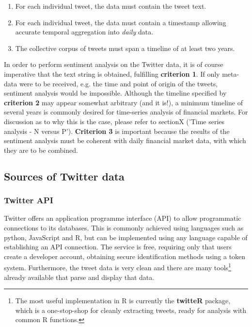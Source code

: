 \documentclass{article}
\begin{document}
\begin{enumerate}
\item For each individual tweet, the data must contain the tweet text.
\item For each individual tweet, the data must contain a timestamp allowing accurate temporal aggregation into \emph{daily} data.
\item The collective corpus of tweets must span a timeline of at least two years.
\end{enumerate}

In order to perform sentiment analysis on the Twitter data, it is of course imperative that the text string is obtained, fulfilling \textbf{criterion 1}. If only meta-data were to be received, e.g. the time and point of origin of the tweets, sentiment analysis would be impossible. Although the timeline specified by \textbf{criterion 2} may appear somewhat arbitrary (and it is!), a minimum timeline of several years is commonly desired for time-series analysis of financial markets. For discussion as to why this is the case, please refer to sectionX ('Time series analysis - N versus P'). \textbf{Criterion 3} is important because the results of the sentiment analysis must be coherent with daily financial market data, with which they are to be combined.


\subsection{Sources of Twitter data}
\label{sec-2-2}


\subsubsection{Twitter API}
\label{sec-2-2-1}
Twitter offers an application programme interface (API) to allow programmatic connections to its databases. This is commonly achieved using languages such as python, JavaScript and R, but can be implemented using any language capable of establishing an API connection.
The service is free, requiring only that users create a developer account, obtaining secure identification methods using a token system. Furthermore, the tweet data is very clean and there are many tools\footnote{The most useful implementation in R is currently the \textbf{twitteR} package, which is a one-stop-shop for cleanly extracting tweets, ready for analysis with common R functions.} already available that parse and display that data.
\end{document}
